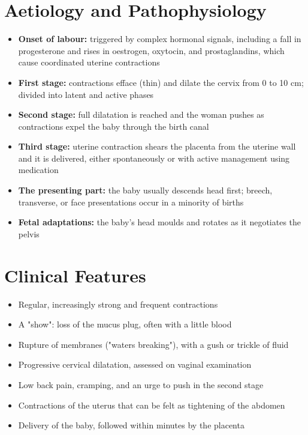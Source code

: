 \section*{Aetiology and Pathophysiology}
\begin{itemize}
    \item \textbf{Onset of labour:} triggered by complex hormonal signals, including a fall in progesterone and rises in oestrogen, oxytocin, and prostaglandins, which cause coordinated uterine contractions
    \item \textbf{First stage:} contractions efface (thin) and dilate the cervix from 0 to 10 cm; divided into latent and active phases
    \item \textbf{Second stage:} full dilatation is reached and the woman pushes as contractions expel the baby through the birth canal
    \item \textbf{Third stage:} uterine contraction shears the placenta from the uterine wall and it is delivered, either spontaneously or with active management using medication
    \item \textbf{The presenting part:} the baby usually descends head first; breech, transverse, or face presentations occur in a minority of births
    \item \textbf{Fetal adaptations:} the baby's head moulds and rotates as it negotiates the pelvis
\end{itemize}

\section*{Clinical Features}
\begin{itemize}
    \item Regular, increasingly strong and frequent contractions
    \item A "show": loss of the mucus plug, often with a little blood
    \item Rupture of membranes ("waters breaking"), with a gush or trickle of fluid
    \item Progressive cervical dilatation, assessed on vaginal examination
    \item Low back pain, cramping, and an urge to push in the second stage
    \item Contractions of the uterus that can be felt as tightening of the abdomen
    \item Delivery of the baby, followed within minutes by the placenta
\end{itemize}

